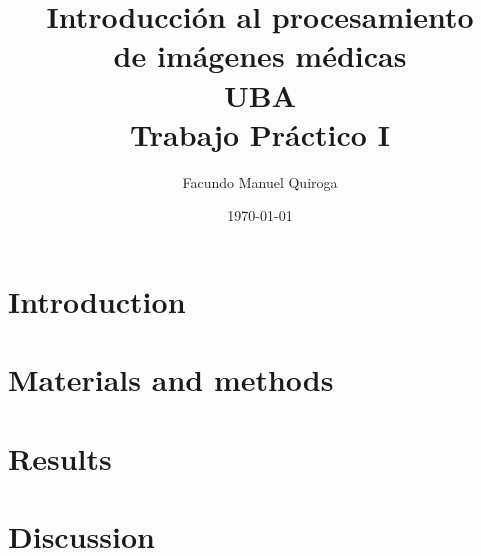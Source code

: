 \documentclass[a4paper, 12pt]{article}
\title{Introducción al procesamiento \\de imágenes médicas\\
UBA\\
Trabajo Práctico I\\
}
\author{
        Facundo Manuel Quiroga
}
\date{\today}
\begin{document}
\maketitle

 

\newcommand{\I}{\ve{I}}
\newcommand{\h}{\ve{H}}
\newcommand{\pv}{\ve{p}}
\newcommand{\qv}{\ve{q}}

\tableofcontents

\section{Introduction}


\section{Materials and methods}
\label{sec:materials}


\section{Results}


\section{Discussion}

	


\end{document}
